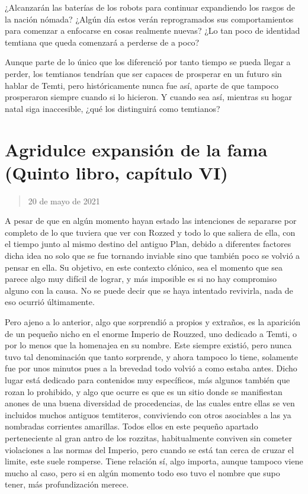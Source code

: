 \documentclass[
  spanish,
]{book}
\begin{document}
¿Alcanzarán las baterías de los robots para continuar expandiendo los rasgos de la nación nómada? ¿Algún día estos verán reprogramados sus comportamientos para comenzar a enfocarse en cosas realmente nuevas? ¿Lo tan poco de identidad temtiana que queda comenzará a perderse de a poco?

Aunque parte de lo único que los diferenció por tanto tiempo se pueda llegar a perder, los temtianos tendrían que ser capaces de prosperar en un futuro sin hablar de Temti, pero históricamente nunca fue así, aparte de que tampoco prosperaron siempre cuando si lo hicieron. Y cuando sea así, mientras su hogar natal siga inaccesible, ¿qué los distinguirá como temtianos?

\hypertarget{agridulce-expansiuxf3n-de-la-fama-quinto-libro-capuxedtulo-vi}{%
\section{Agridulce expansión de la fama (Quinto libro, capítulo VI)}\label{agridulce-expansiuxf3n-de-la-fama-quinto-libro-capuxedtulo-vi}}

\begin{quote}
20 de mayo de 2021
\end{quote}

A pesar de que en algún momento hayan estado las intenciones de separarse por completo de lo que tuviera que ver con Rozzed y todo lo que saliera de ella, con el tiempo junto al mismo destino del antiguo Plan, debido a diferentes factores dicha idea no solo que se fue tornando inviable sino que también poco se volvió a pensar en ella. Su objetivo, en este contexto clónico, sea el momento que sea parece algo muy difícil de lograr, y más imposible es si no hay compromiso alguno con la causa. No se puede decir que se haya intentado revivirla, nada de eso ocurrió últimamente.

Pero ajeno a lo anterior, algo que sorprendió a propios y extraños, es la aparición de un pequeño nicho en el enorme Imperio de Rouzzed, uno dedicado a Temti, o por lo menos que la homenajea en su nombre. Este siempre existió, pero nunca tuvo tal denominación que tanto sorprende, y ahora tampoco lo tiene, solamente fue por unos minutos pues a la brevedad todo volvió a como estaba antes. Dicho lugar está dedicado para contenidos muy específicos, más algunos también que rozan lo prohibido, y algo que ocurre es que es un sitio donde se manifiestan anones de una buena diversidad de procedencias, de las cuales entre ellas se ven incluidos muchos antiguos temtiteros, conviviendo con otros asociables a las ya nombradas corrientes amarillas. Todos ellos en este pequeño apartado perteneciente al gran antro de los rozzitas, habitualmente conviven sin cometer violaciones a las normas del Imperio, pero cuando se está tan cerca de cruzar el limite, este suele romperse. Tiene relación sí, algo importa, aunque tampoco viene mucho al caso, pero si en algún momento todo eso tuvo el nombre que supo tener, más profundización merece.
\end{document}
